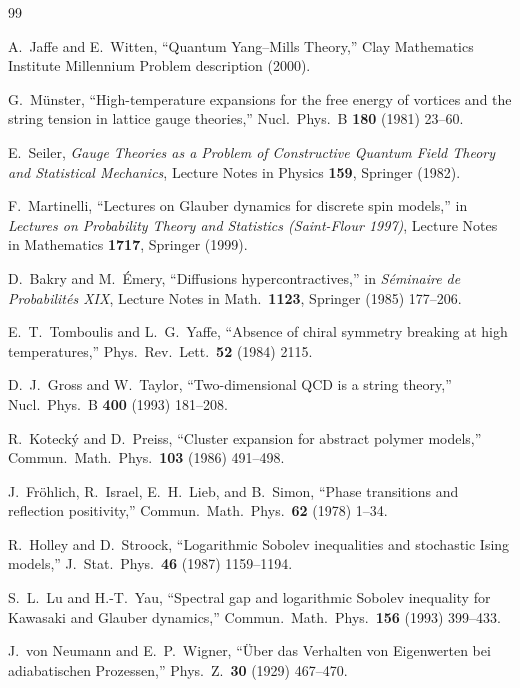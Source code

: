 \documentclass[12pt,a4paper]{article}
\begin{document}
\begin{thebibliography}{99}

 A.~Jaffe and E.~Witten, ``Quantum Yang--Mills Theory,'' Clay Mathematics Institute Millennium Problem description (2000).

 G.~M\"unster, ``High-temperature expansions for the free energy of vortices and the string tension in lattice gauge theories,'' Nucl.\ Phys.\ B \textbf{180} (1981) 23--60.

 E.~Seiler, \emph{Gauge Theories as a Problem of Constructive Quantum Field Theory and Statistical Mechanics}, Lecture Notes in Physics \textbf{159}, Springer (1982).

 F.~Martinelli, ``Lectures on Glauber dynamics for discrete spin models,'' in \emph{Lectures on Probability Theory and Statistics (Saint-Flour 1997)}, Lecture Notes in Mathematics \textbf{1717}, Springer (1999).

 D.~Bakry and M.~\'Emery, ``Diffusions hypercontractives,'' in \emph{S\'eminaire de Probabilit\'es XIX}, Lecture Notes in Math.\ \textbf{1123}, Springer (1985) 177--206.

 E.~T.~Tomboulis and L.~G.~Yaffe, ``Absence of chiral symmetry breaking at high temperatures,'' Phys.\ Rev.\ Lett.\ \textbf{52} (1984) 2115.

 D.~J.~Gross and W.~Taylor, ``Two-dimensional QCD is a string theory,'' Nucl.\ Phys.\ B \textbf{400} (1993) 181--208.

 R.~Koteck\'y and D.~Preiss, ``Cluster expansion for abstract polymer models,'' Commun.\ Math.\ Phys.\ \textbf{103} (1986) 491--498.

 J.~Fr\"ohlich, R.~Israel, E.~H.~Lieb, and B.~Simon, ``Phase transitions and reflection positivity,'' Commun.\ Math.\ Phys.\ \textbf{62} (1978) 1--34.

 R.~Holley and D.~Stroock, ``Logarithmic Sobolev inequalities and stochastic Ising models,'' J.~Stat.\ Phys.\ \textbf{46} (1987) 1159--1194.

 S.~L.~Lu and H.-T.~Yau, ``Spectral gap and logarithmic Sobolev inequality for Kawasaki and Glauber dynamics,'' Commun.\ Math.\ Phys.\ \textbf{156} (1993) 399--433.

 J.~von Neumann and E.~P.~Wigner, ``\"Uber das Verhalten von Eigenwerten bei adiabatischen Prozessen,'' Phys.\ Z.\ \textbf{30} (1929) 467--470.


\end{thebibliography}
\end{document}

